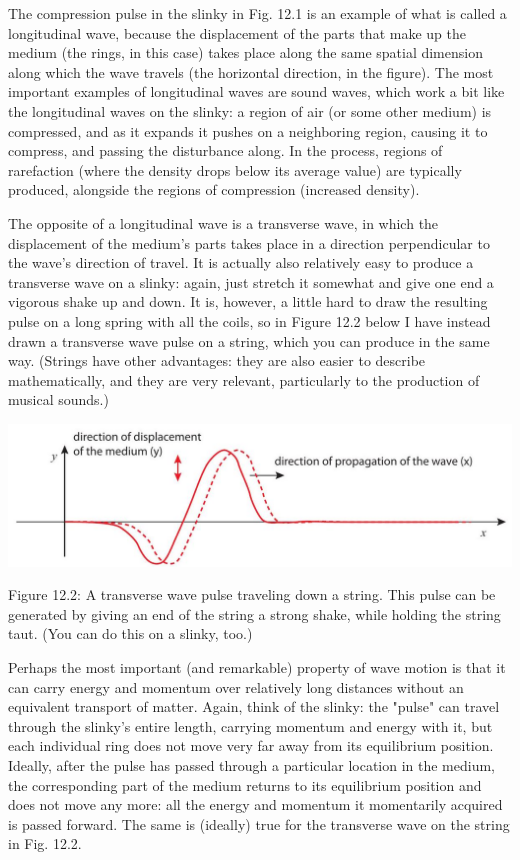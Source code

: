 \documentclass[10pt]{article}
\begin{document}
The compression pulse in the slinky in Fig. 12.1 is an example of what is called a longitudinal wave, because the displacement of the parts that make up the medium (the rings, in this case) takes place along the same spatial dimension along which the wave travels (the horizontal direction, in the figure). The most important examples of longitudinal waves are sound waves, which work a bit like the longitudinal waves on the slinky: a region of air (or some other medium) is compressed, and as it expands it pushes on a neighboring region, causing it to compress, and passing the disturbance along. In the process, regions of rarefaction (where the density drops below its average value) are typically produced, alongside the regions of compression (increased density).

The opposite of a longitudinal wave is a transverse wave, in which the displacement of the medium's parts takes place in a direction perpendicular to the wave's direction of travel. It is actually also relatively easy to produce a transverse wave on a slinky: again, just stretch it somewhat and give one end a vigorous shake up and down. It is, however, a little hard to draw the resulting pulse on a long spring with all the coils, so in Figure 12.2 below I have instead drawn a transverse wave pulse on a string, which you can produce in the same way. (Strings have other advantages: they are also easier to describe mathematically, and they are very relevant, particularly to the production of musical sounds.)

\begin{center}
\includegraphics[max width=\textwidth]{2024_09_14_9969b06773f10b6936e8g-298}
\end{center}

Figure 12.2: A transverse wave pulse traveling down a string. This pulse can be generated by giving an end of the string a strong shake, while holding the string taut. (You can do this on a slinky, too.)

Perhaps the most important (and remarkable) property of wave motion is that it can carry energy and momentum over relatively long distances without an equivalent transport of matter. Again, think of the slinky: the "pulse" can travel through the slinky's entire length, carrying momentum and energy with it, but each individual ring does not move very far away from its equilibrium position. Ideally, after the pulse has passed through a particular location in the medium, the corresponding part of the medium returns to its equilibrium position and does not move any more: all the energy and momentum it momentarily acquired is passed forward. The same is (ideally) true for the transverse wave on the string in Fig. 12.2.
\end{document}
